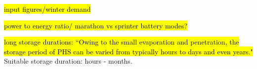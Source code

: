 \hl{input figures/winter demand}



\hl{power to energy ratio/ marathon vs sprinter battery modes?}

\hl{long storage durations: ``Owing to the small evaporation
and penetration, the storage period of PHS can be varied
from typically hours to days and even years."}
Suitable storage duration: hours - months.
 \citep{Chen2009}

\begin{comment}
\textbf{Power-to-energy ratio (P/E ratio)}

``If the battery system will be used primarily to provide frequency regulation, the battery system needs to charge and discharge many times over short durations of time. A system used in this type of scenario will be designed with a higher power rating. If a battery system will be used primarily to provide peak-shifting or must provide backup power in case of a grid outage, the battery needs to be able to discharge over a longer period (e.g., 2 – 5 hours) and is designed with a higher energy rating."
\url{https://www.nrel.gov/state-local-tribal/blog/posts/batteries-101-series-how-to-talk-about-batteries-and-power-to-energy-ratios.html}

C.f. ``"Marathon" and "sprinter" metrics"
\url{https://www.greentechmedia.com/articles/read/comparing-energy-storage-its-not-that-simple#gs.3osuww}

``Concluding Thoughts
The optimum specifications for a PHS scheme in Scotland used to store surplus wind power for use during calm periods should have a power / stored energy ratio ~ 0.006. Given the storage size of Coire Glas = 30 GWh the power rating should ideally be ~ 180 MW and not the massive 1500 MW now proposed for the site. The 180 MW power rating would drain the reservoir in 7 days of continuous name plate capacity use. The facility would now be used for 7 out of 21 days (A+B+C), i.e. the equivalent of 1 day in 3 which is the closest we have got to every day, the norm for making PHS profitable. The catch now, however, is that the puny beast has now become totally limp with a power rating of only 180 MW – it can never ever make money."
\url{http://euanmearns.com/coire-glas-the-raging-best-of-pumped-hydro-storage/}
\end{comment}